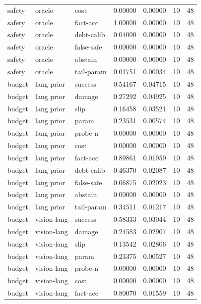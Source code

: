 \documentclass{article}
\begin{document}
\begin{center}
\begin{longtable}{lllllll}
safety & oracle & cost & 0.00000 & 0.00000 & 10 & 48 \\
safety & oracle & fact-acc & 1.00000 & 0.00000 & 10 & 48 \\
safety & oracle & debt-calib & 0.04000 & 0.00000 & 10 & 48 \\
safety & oracle & false-safe & 0.00000 & 0.00000 & 10 & 48 \\
safety & oracle & abstain & 0.00000 & 0.00000 & 10 & 48 \\
safety & oracle & tail-param & 0.01751 & 0.00034 & 10 & 48 \\
budget & lang prior & success & 0.54167 & 0.04715 & 10 & 48 \\
budget & lang prior & damage & 0.27292 & 0.04925 & 10 & 48 \\
budget & lang prior & slip & 0.16458 & 0.03521 & 10 & 48 \\
budget & lang prior & param & 0.23531 & 0.00574 & 10 & 48 \\
budget & lang prior & probe-n & 0.00000 & 0.00000 & 10 & 48 \\
budget & lang prior & cost & 0.00000 & 0.00000 & 10 & 48 \\
budget & lang prior & fact-acc & 0.89861 & 0.01959 & 10 & 48 \\
budget & lang prior & debt-calib & 0.46370 & 0.02087 & 10 & 48 \\
budget & lang prior & false-safe & 0.06875 & 0.02023 & 10 & 48 \\
budget & lang prior & abstain & 0.00000 & 0.00000 & 10 & 48 \\
budget & lang prior & tail-param & 0.34511 & 0.01217 & 10 & 48 \\
budget & vision-lang & success & 0.58333 & 0.03044 & 10 & 48 \\
budget & vision-lang & damage & 0.24583 & 0.02907 & 10 & 48 \\
budget & vision-lang & slip & 0.13542 & 0.02806 & 10 & 48 \\
budget & vision-lang & param & 0.23375 & 0.00527 & 10 & 48 \\
budget & vision-lang & probe-n & 0.00000 & 0.00000 & 10 & 48 \\
budget & vision-lang & cost & 0.00000 & 0.00000 & 10 & 48 \\
budget & vision-lang & fact-acc & 0.80070 & 0.01559 & 10 & 48 \\
\bottomrule
\end{longtable}
\renewcommand{\arraystretch}{1.0}
\end{center}
\end{document}

